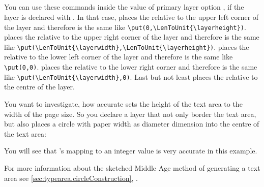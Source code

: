 \begin{Declaration}
  \\
  \\
  \\
  \\
\end{Declaration}
%
%
%
%
%
You can use these commands inside the
value of primary layer option , if the layer is declared with
. In that case,  places the
 relative to the upper left corner of the layer and therefore
is the same like
\lstinline[breaklines=false]|\put(0,\LenToUnit{\layerheight})|. 
places the  relative to the upper right corner of the layer and
therefore is the same like
\lstinline[breaklines=false]|\put(\LenToUnit{\layerwidth},\LenToUnit{\layerheight})|.
 places the  relative to the lower left corner of
the layer and therefore is the same like
\lstinline[breaklines=false]|\put(0,0)|.  places the
 relative to the lower right corner and therefore is the same
like \lstinline[breaklines=false]|\put(\LenToUnit{\layerwidth},0)|. Last but
not least  places the  relative to the centre of
the layer.%
\begin{Example}
  You want to investigate, how accurate  sets the
  height of the text area to the width of the page size. So you declare a
  layer that not only border the text area, but also places a circle with
  paper width as diameter dimension into the centre of the text area:
  You will see that 's mapping to an integer 
  value is very accurate in this example.
\end{Example}
For more information about the sketched Middle Age method of generating a text
area see \autoref{sec:typearea.circleConstruction},
.


